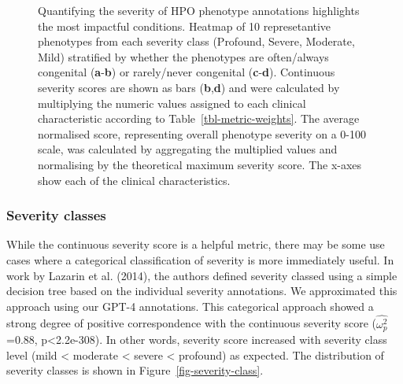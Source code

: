 \documentclass[
]{agujournal2019}
\begin{document}
\label{cell-fig-top-phenos}
\begin{figure}[H]


\caption{\label{fig-top-phenos}Quantifying the severity of HPO phenotype
annotations highlights the most impactful conditions. Heatmap of 10
represetantive phenotypes from each severity class (Profound, Severe,
Moderate, Mild) stratified by whether the phenotypes are often/always
congenital (\textbf{a}-\textbf{b}) or rarely/never congenital
(\textbf{c}-\textbf{d}). Continuous severity scores are shown as bars
(\textbf{b},\textbf{d}) and were calculated by multiplying the numeric
values assigned to each clinical characteristic according to
Table~\ref{tbl-metric-weights}. The average normalised score,
representing overall phenotype severity on a 0-100 scale, was calculated
by aggregating the multiplied values and normalising by the theoretical
maximum severity score. The x-axes show each of the clinical
characteristics.}

\end{figure}%

\subsubsection{Severity classes}\label{severity-classes}

While the continuous severity score is a helpful metric, there may be
some use cases where a categorical classification of severity is more
immediately useful. In work by Lazarin et al. (2014), the authors
defined severity classed using a simple decision tree based on the
individual severity annotations. We approximated this approach using our
GPT-4 annotations. This categorical approach showed a strong degree of
positive correspondence with the continuous severity score
(\(\hat{\omega_{p}^2}\)=0.88, p\textless2.2e-308). In other words,
severity score increased with severity class level (mild \textless{}
moderate \textless{} severe \textless{} profound) as expected. The
distribution of severity classes is shown in
Figure~\ref{fig-severity-class}.
\end{document}

